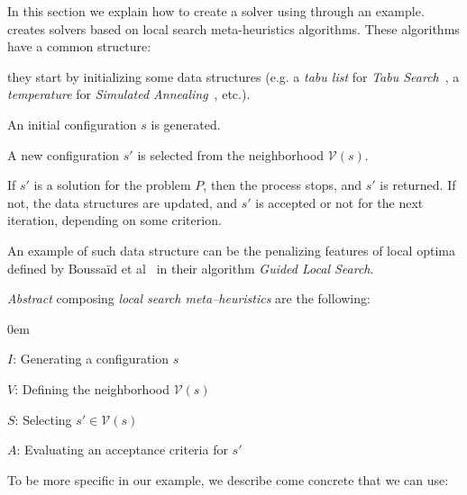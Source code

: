 In this section we explain how to create a solver using \posl{} through an example. \posl{} creates solvers based on local search meta-heuristics algorithms. These algorithms have a common structure: \begin{inparaenum}[1.] \item they start by initializing some data structures (e.g. a \emph{tabu list} for \emph{Tabu Search}~\cite{Gendreau2010}, a \emph{temperature} for \emph{Simulated Annealing}~\cite{Nikolaev2010}, etc.). \item An initial configuration $s$ is generated. \item A new configuration $s'$ is selected from the neighborhood $\mathcal{V}\left(s\right)$. \item If $s'$ is a solution for the problem $P$, then the process stops, and $s'$ is returned. If not, the data structures are updated, and $s'$ is accepted or not for the next iteration, depending on some criterion.\end{inparaenum} An example of such data structure can be the penalizing features of local optima defined by Boussaïd et al~\cite{Boussaid2013} in their algorithm \emph{Guided Local Search}.


{\it Abstract} \oms{} composing \emph{local search meta--heuristics} are the following:

\begin{list}{}{} \itemsep0em 
	\item $I$: Generating a configuration $s$
	\item $V$: Defining the neighborhood $\mathcal{V}\left(s\right)$
	\item $S$: Selecting $s' \in \mathcal{V}\left(s\right)$
	\item $A$: Evaluating an acceptance criteria for $s'$
\end{list}

To be more specific in our example, we describe come concrete \oms{} that we can use:

